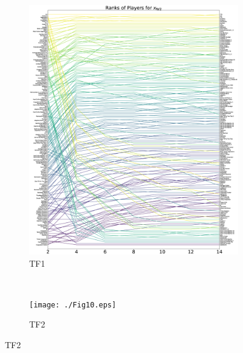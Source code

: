 \documentclass[10pt,letterpaper]{article}
\begin{document}
\begin{figure}[!hbtp]
    \centering
    \begin{subfigure}[t]{.5\columnwidth}
        \centering
        \includegraphics[draft, width=\columnwidth]{./Fig9.eps}
        \caption{TF1}
    \end{subfigure}%
    ~
    \begin{subfigure}[t]{.5\columnwidth}
        \centering
        \texttt{[image: ./Fig10.eps]}
        \caption{TF2}
    \end{subfigure}


\end{figure}
\end{document}
